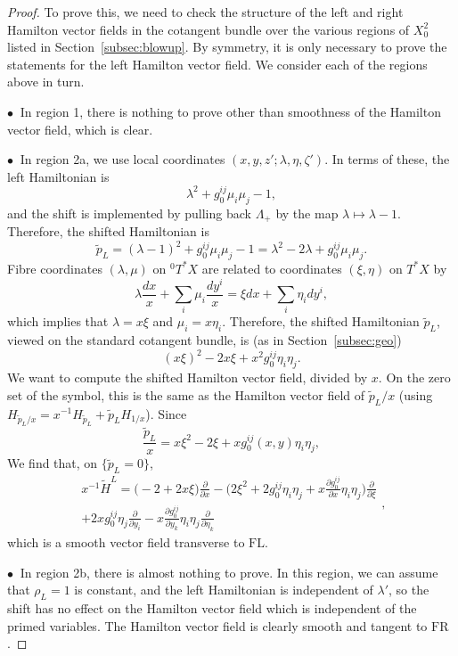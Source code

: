 \documentclass[10pt, a4paper, twoside]{amsart}
\numberwithin{equation}{section}
\theoremstyle{remark}
\begin{document}
\begin{proof} To prove this, we need to check the structure of the left and right Hamilton vector fields in the cotangent bundle over  the various regions of $X^2_0$ listed in Section~\ref{subsec:blowup}.
By symmetry, it is only necessary to prove the statements for the left Hamilton vector field. We consider each of the regions above in turn.

$\bullet \ $ In region 1, there is nothing to prove other than smoothness of the Hamilton vector field, which is clear.

$\bullet \ $ In region 2a, we use local coordinates $(x, y, z'; \lambda, \eta, \zeta')$. In terms of these, the left Hamiltonian is
$$
\lambda^2 + g_0^{ij} \mu_i \mu_j - 1,
$$
and the shift is implemented by pulling back $\Lambda_+$ by the map $\lambda \mapsto \lambda - 1$.  Therefore, the shifted Hamiltonian is
\begin{equation}
{\tilde p_L} = (\lambda-1)^2 +  g_0^{ij} \mu_i \mu_j - 1 = \lambda^2 - 2\lambda + g_0^{ij} \mu_i \mu_j .
\label{shifted-Ham-r1}\end{equation}
Fibre coordinates $(\lambda, \mu)$ on ${}^0 T^* X$ are related to coordinates $(\xi, \eta)$ on $T^* X$ by
$$
\lambda \frac{dx}{x} + \sum_i \mu_i \frac{dy^i}{x} = \xi dx + \sum_i \eta_i dy^i,
$$
which implies that $\lambda = x \xi$ and $\mu_i = x \eta_i$. Therefore, the shifted Hamiltonian ${\tilde p_L}$,  viewed on the standard cotangent bundle, is (as in Section~\ref{subsec:geo})
$$
(x \xi)^2 - 2 x \xi + x^2 g_0^{ij} \eta_i \eta_j.
$$
We want to compute the shifted Hamilton vector field,  divided by $x$. On the zero set of the symbol, this is the same as the Hamilton vector field of ${\tilde p_L}/x$ (using $H_{{\tilde p_L}/x} = x^{-1}  H_{\tilde p_L} + {\tilde p_L} H_{1/x}$). Since
$$
\frac{\tilde p_L}{x} = x \xi^2 - 2  \xi + x g_0^{ij}(x,y) \eta_i \eta_j,
$$
We find that, on $\{ {\tilde p_L} = 0 \}$,
$$\begin{gathered}
x^{-1} {\tilde H^L} = \big( - 2 + 2x\xi \big) \frac{\partial}{\partial x} - \big(2\xi^2 +2 g_0^{ij} \eta_i \eta_j + x \frac{\partial g_0^{ij}}{\partial x}\eta_i\eta_j \big)   \frac{\partial}{\partial \xi} \\ + 2x g_0^{ij}\eta_j \frac{\partial}{\partial y_i}  - x\frac{\partial g_0^{ij}}{\partial y_k}\eta_i\eta_j\frac{\partial}{\partial \eta_k}\end{gathered},
$$
which is a smooth vector field transverse to ${\mathrm{FL}}$.

$\bullet \ $ In region 2b, there is almost nothing to prove. In this region, we can assume that $\rho_L = 1$ is constant, and the left Hamiltonian is independent of $\lambda'$, so the shift has no effect on the Hamilton vector field which is independent of the primed variables. The Hamilton vector field is clearly smooth and tangent to ${\mathrm{FR}}$.


\end{proof}
\end{document}
